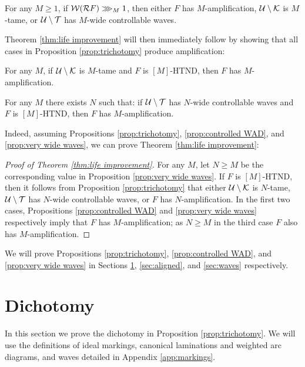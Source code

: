 \documentclass[12pt]{amsart}
\begin{document}
\begin{proposition}\label{prop:trichotomy}
    For any $M\geq 1$, if $\mathcal W(\mathcal R F)\ggg_{M} 1$, then either 
	$F$ has $M$-amplification, $\mathcal U\setminus \mathcal K$ is $M$-tame, or 
	$\mathcal U\setminus \mathcal T$ has $M$-wide controllable waves.
\end{proposition}

Theorem \ref{thm:life improvement} will then immediately follow by showing that all cases in Proposition \ref{prop:trichotomy} produce amplification:

\begin{prop}\label{prop:controlled WAD}
	For any $M$,  if 
	$\mathcal U\setminus \mathcal K$ is $M$-tame and $F$ is $[M]$-HTND, 
	then $F$ has $M$-amplification.
\end{prop}

\begin{prop}\label{prop:very wide waves}
	For any $M$ there exists $N$ such that: if $\mathcal U\setminus \mathcal T$ has $N$-wide controllable waves and $F$ is $[M]$-HTND,  
	then $F$ has $M$-amplification.
\end{prop}

Indeed, assuming Propositions  \ref{prop:trichotomy}, \ref{prop:controlled WAD}, and \ref{prop:very wide waves}, we can prove Theorem \ref{thm:life improvement}:

\begin{proof}[Proof of Theorem \ref{thm:life improvement}]
	For any $M$, let $N\geq M$ be the corresponding value in Proposition \ref{prop:very wide waves}. If $F$ is $[M]$-HTND, then it follows from Proposition \ref{prop:trichotomy} that either $\mathcal U\setminus \mathcal K$ is $N$-tame,  $\mathcal U\setminus \mathcal T$ has $N$-wide controllable waves, or $F$ has  $N$-amplification. In the first two cases, Propositions \ref{prop:controlled WAD} and \ref{prop:very wide waves} respectively imply that $F$ has $M$-amplification; as $N\geq M$ in the third case $F$ also has $M$-amplification.
\end{proof}

We will prove Propositions \ref{prop:trichotomy}, \ref{prop:controlled WAD}, and \ref{prop:very wide waves} in Sections \ref{sec:trichotomy}, \ref{sec:aligned}, and \ref{sec:waves} respectively.


\section{Dichotomy}\label{sec:trichotomy}


In this section we prove the dichotomy in Proposition \ref{prop:trichotomy}.
We will use the definitions of  ideal markings, canonical laminations and weighted arc diagrams, and waves detailed in Appendix \ref{app:markings}.
\end{document}
